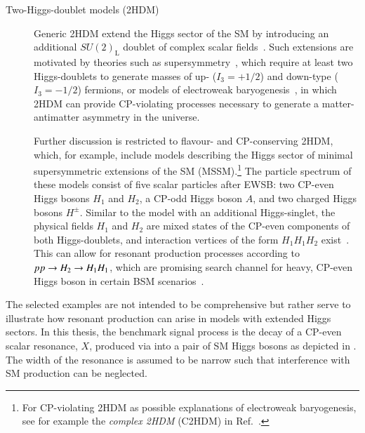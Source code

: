 \begin{description}
\item[Two-Higgs-doublet models (2HDM)] Generic 2HDM extend the Higgs sector of
  the SM by introducing an additional $SU(2)_{\text{L}}$ doublet of complex
  scalar fields~\cite{Gunion:1989we,Branco:2011iw}. Such extensions are
  motivated by theories such as supersymmetry~\cite{Haber:1984rc}, which require
  at least two Higgs-doublets to generate masses of up- ($I_3 = + 1/2$) and
  down-type ($I_3 = - 1/2$) fermions, or models of electroweak
  baryogenesis~\cite{Trodden:1998ym}, in which 2HDM can provide CP-violating
  processes necessary to generate a matter-antimatter asymmetry in the universe.

  Further discussion is restricted to flavour- and CP-conserving 2HDM, which,
  for example, include models describing the Higgs sector of minimal
  supersymmetric extensions of the SM (MSSM).\footnote{For CP-violating 2HDM as
    possible explanations of electroweak baryogenesis, see for example the
    \emph{complex 2HDM} (C2HDM) in Ref.~\cite{Fontes:2017zfn}.}
  The particle spectrum of these models consist of five scalar particles after
  EWSB: two CP-even Higgs bosons $H_1$ and $H_2$, a CP-odd Higgs boson $A$, and
  two charged Higgs bosons $H^\pm$. Similar to the model with an additional
  Higgs-singlet, the physical fields $H_1$ and $H_2$ are mixed states of the
  CP-even components of both Higgs-doublets, and interaction vertices of the
  form $H_1 H_1 H_2$ exist~\cite{Gunion:1989we,Branco:2011iw}. This can allow
  for resonant production processes according to $pp \to H_2 \to H_1 H_1$,
  which are promising search channel for heavy, CP-even Higgs boson in certain
  BSM scenarios~\cite{Dolan:2012ac,Djouadi:2013vqa,Djouadi:2013uqa}.

\end{description}
The selected examples are not intended to be comprehensive but rather serve to
illustrate how resonant \HH production can arise in models with extended Higgs
sectors. In this thesis, the benchmark signal process is the decay of a CP-even
scalar resonance, $X$, produced via \ggF into a pair of SM Higgs bosons as
depicted in . The width of the resonance is
assumed to be narrow such that interference with SM \HH production can be
neglected.

